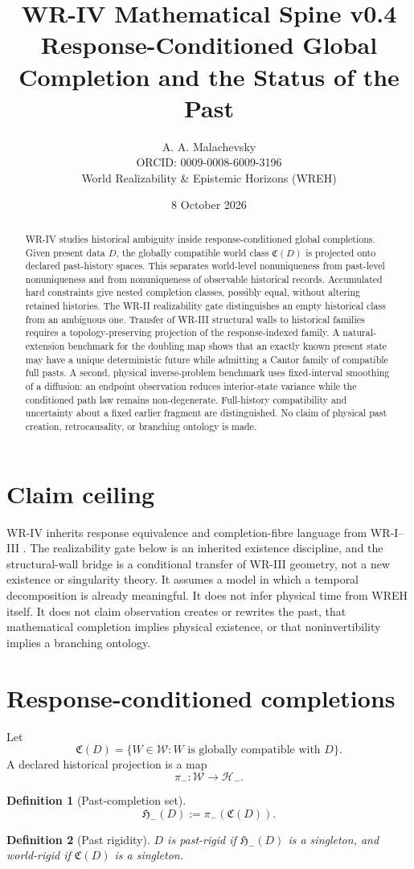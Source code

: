 \documentclass[11pt]{article}
\title{\textbf{WR-IV Mathematical Spine v0.4}\\[4pt]\large Response-Conditioned Global Completion and the Status of the Past}
\author{A. A. Malachevsky\\ORCID: 0009-0008-6009-3196\\World Realizability \& Epistemic Horizons (WREH)}
\date{8 October 2026}
\newtheorem{definition}{Definition}[section]
\newcommand{\Wcal}{\mathcal W}
\newcommand{\Ccal}{\mathfrak C}
\newcommand{\Hminus}{\mathcal H_-}
\newcommand{\Pcal}{\mathfrak H_-}
\begin{document}
\maketitle

\begin{abstract}
WR-IV studies historical ambiguity inside response-conditioned global completions. Given present data $D$, the globally compatible world class $\Ccal(D)$ is projected onto declared past-history spaces. This separates world-level nonuniqueness from past-level nonuniqueness and from nonuniqueness of observable historical records. Accumulated hard constraints give nested completion classes, possibly equal, without altering retained histories. The WR-II realizability gate distinguishes an empty historical class from an ambiguous one. Transfer of WR-III structural walls to historical families requires a topology-preserving projection of the response-indexed family. A natural-extension benchmark for the doubling map shows that an exactly known present state may have a unique deterministic future while admitting a Cantor family of compatible full pasts. A second, physical inverse-problem benchmark uses fixed-interval smoothing of a diffusion: an endpoint observation reduces interior-state variance while the conditioned path law remains non-degenerate. Full-history compatibility and uncertainty about a fixed earlier fragment are distinguished. No claim of physical past creation, retrocausality, or branching ontology is made.
\end{abstract}

\section{Claim ceiling}
WR-IV inherits response equivalence and completion-fibre language from
WR-I--III \cite{WRI,WRII,WRIII}. The realizability gate below is an
inherited existence discipline, and the structural-wall bridge is a
conditional transfer of WR-III geometry, not a new existence or
singularity theory. It assumes a model in which a temporal
decomposition is already meaningful. It does not infer physical time from WREH itself. It does not claim observation creates or rewrites the past, that mathematical completion implies physical existence, or that noninvertibility implies a branching ontology.

\section{Response-conditioned completions}
Let
\[
\Ccal(D)=\{W\in\Wcal: W\text{ is globally compatible with }D\}.
\]
A declared historical projection is a map
\[
\pi_-:\Wcal\to\Hminus.
\]
\begin{definition}[Past-completion set]
\[
\Pcal(D):=\pi_-(\Ccal(D)).
\]
\end{definition}
\begin{definition}[Past rigidity]
$D$ is past-rigid if $\Pcal(D)$ is a singleton, and world-rigid if $\Ccal(D)$ is a singleton.
\end{definition}
\end{document}
